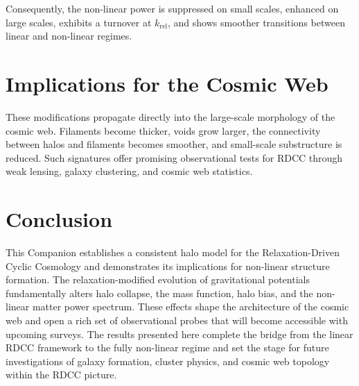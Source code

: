 \documentclass[11pt,a4paper]{article}
\begin{document}
Consequently, the non-linear power is suppressed on small scales, enhanced on large scales, exhibits a turnover at \(k_{\mathrm{rel}}\), and shows smoother transitions between linear and non-linear regimes.
\section{Implications for the Cosmic Web}

These modifications propagate directly into the large-scale morphology of the cosmic web. Filaments become thicker, voids grow larger, the connectivity between halos and filaments becomes smoother, and small-scale substructure is reduced. Such signatures offer promising observational tests for RDCC through weak lensing, galaxy clustering, and cosmic web statistics.

\section{Conclusion}

This Companion establishes a consistent halo model for the Relaxation-Driven Cyclic Cosmology and demonstrates its implications for non-linear structure formation. The relaxation-modified evolution of gravitational potentials fundamentally alters halo collapse, the mass function, halo bias, and the non-linear matter power spectrum. These effects shape the architecture of the cosmic web and open a rich set of observational probes that will become accessible with upcoming surveys. The results presented here complete the bridge from the linear RDCC framework to the fully non-linear regime and set the stage for future investigations of galaxy formation, cluster physics, and cosmic web topology within the RDCC picture.

\end{document}
